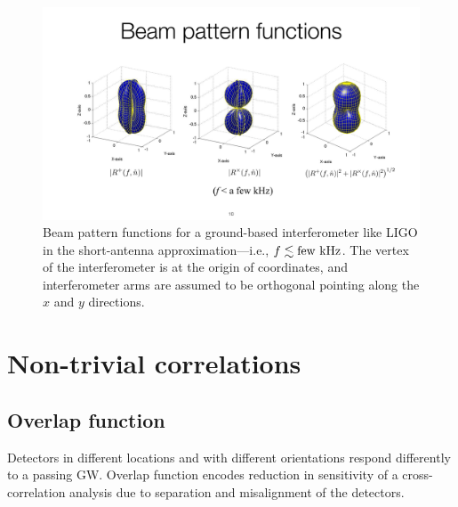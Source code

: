 \begin{figure}[htbp!]
\begin{center}
\includegraphics[width=\textwidth]{Figures/LIGO_beam_patterns}
\caption{Beam pattern functions for a ground-based interferometer
like LIGO in the short-antenna approximation---i.e., $f\lesssim {\rm few\ kHz}$.
The vertex of the interferometer is at the origin of coordinates,
and interferometer arms are assumed to be orthogonal pointing along
the $x$ and $y$ directions.}
\label{f:LIGO_beam_patterns}
\end{center}
\end{figure}

\section{Non-trivial correlations}
\label{s:nontrivial_correlations}

\subsection{Overlap function}

Detectors in different locations and with different 
orientations respond differently to a passing GW.
Overlap function encodes reduction in sensitivity of a
cross-correlation analysis due to separation and misalignment 
of the detectors.

